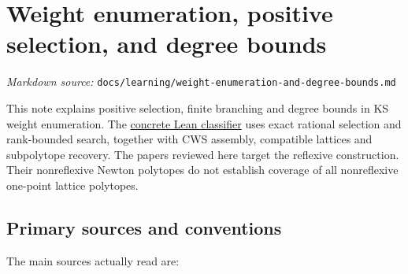 \documentclass[11pt,a4paper,oneside]{report}
\begin{document}
\chapter{Weight enumeration, positive selection, and degree
bounds}\label{weight-enumeration-and-degree-bounds--weight-enumeration-positive-selection-and-degree-bounds}

\noindent\textit{Markdown source: }\texttt{docs/\allowbreak{}learning\allowbreak{}/\allowbreak{}weight-\allowbreak{}enumerat\allowbreak{}ion-\allowbreak{}and-\allowbreak{}degree-\allowbreak{}bounds.\allowbreak{}md}

This note explains positive selection, finite branching and degree
bounds in KS weight enumeration. The
\href{../../proofs/STATEMENTS.md}{concrete Lean classifier} uses exact
rational selection and rank-bounded search, together with CWS assembly,
compatible lattices and subpolytope recovery. The papers reviewed here
target the reflexive construction. Their nonreflexive Newton polytopes
do not establish coverage of all nonreflexive one-point lattice
polytopes.

\section{Primary sources and
conventions}\label{weight-enumeration-and-degree-bounds--primary-sources-and-conventions}

The main sources actually read are:
\end{document}
